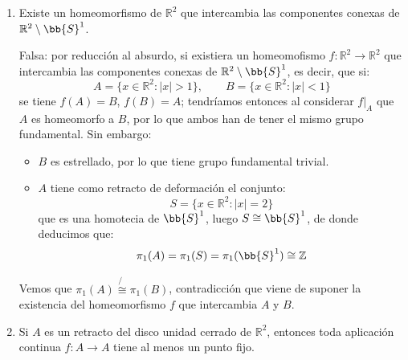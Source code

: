 \begin{ejercicio}
\begin{enumerate}[label=\alph*)]
            Como $\pi_1(D)\cong \{1\}$ y $\pi_1(D)\cong \pi_1(\bb{S}^1)\cong \mathbb{Z}$, llegamos a una contradicción, por lo que no puede existir un retracto de deformación $D\subsetneq \bb{S}^1$.
        \item Existe un homeomorfismo de $\mathbb{R}^2$ que intercambia las componentes conexas de $\mathbb{R}^2\setminus \bb{S}^1$.

            Falsa: por reducción al absurdo, si existiera un homeomofismo $f:\mathbb{R}^2\to \mathbb{R}^2$ que intercambia las componentes conexas de $\mathbb{R}^2\setminus \bb{S}^1$, es decir, que si:
            \begin{equation*}
                A = \{x\in \mathbb{R}^2 : |x| > 1\}, \qquad B = \{x\in \mathbb{R}^2 : |x|<1\}
            \end{equation*}
            se tiene $f(A) = B$, $f(B) = A$; tendríamos entonces al considerar $f\big|_A$ que $A$ es homeomorfo a $B$, por lo que ambos han de tener el mismo grupo fundamental. Sin embargo:
            \begin{itemize}
                \item $B$ es estrellado, por lo que tiene grupo fundamental trivial.
                \item $A$ tiene como retracto de deformación el conjunto:
                    \begin{equation*}
                        S = \{x\in \mathbb{R}^2 : |x| = 2\}
                    \end{equation*}
                    que es una homotecia de $\bb{S}^1$, luego $S\cong\bb{S}^1$, de donde deducimos que:
                    \begin{equation*}
                        \pi_1(A) = \pi_1(S) = \pi_1(\bb{S}^1)\cong \mathbb{Z}
                    \end{equation*}
            \end{itemize}
            Vemos que $\pi_1(A)\not{\cong} \pi_1(B)$, contradicción que viene de suponer la existencia del homeomorfismo $f$ que intercambia $A$ y $B$.
        \item Si $A$ es un retracto del disco unidad cerrado de $\mathbb{R}^2$, entonces toda aplicación continua $f:A\to A$ tiene al menos un punto fijo.


\end{enumerate}
\end{ejercicio}
